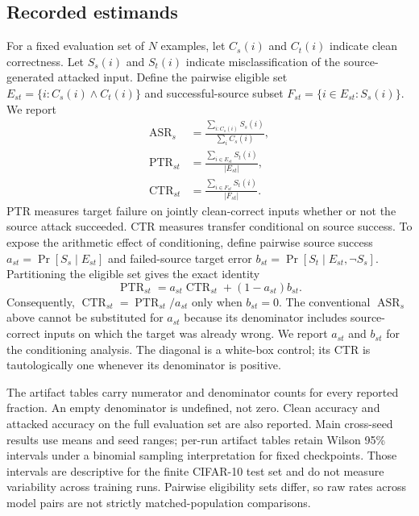 \documentclass[10pt]{article}
\begin{document}
\subsection{Recorded estimands}
For a fixed evaluation set of $N$ examples, let $C_s(i)$ and $C_t(i)$ indicate clean correctness. Let $S_s(i)$ and $S_t(i)$ indicate misclassification of the source-generated attacked input. Define the pairwise eligible set $E_{st}=\{i:C_s(i)\land C_t(i)\}$ and successful-source subset $F_{st}=\{i\in E_{st}:S_s(i)\}$. We report
\begin{align}
\operatorname{ASR}_s &= \frac{\sum_{i:C_s(i)} S_s(i)}{\sum_i C_s(i)},\\
\operatorname{PTR}_{st} &= \frac{\sum_{i\in E_{st}} S_t(i)}{|E_{st}|},\\
\operatorname{CTR}_{st} &= \frac{\sum_{i\in F_{st}} S_t(i)}{|F_{st}|}.
\end{align}
PTR measures target failure on jointly clean-correct inputs whether or not the source attack succeeded. CTR measures transfer conditional on source success. To expose the arithmetic effect of conditioning, define pairwise source success $a_{st}=\Pr[S_s\mid E_{st}]$ and failed-source target error $b_{st}=\Pr[S_t\mid E_{st},\neg S_s]$. Partitioning the eligible set gives the exact identity
\begin{equation}
\operatorname{PTR}_{st}=a_{st}\operatorname{CTR}_{st}+(1-a_{st})b_{st}.
\end{equation}
Consequently, $\operatorname{CTR}_{st}=\operatorname{PTR}_{st}/a_{st}$ only when $b_{st}=0$. The conventional $\operatorname{ASR}_s$ above cannot be substituted for $a_{st}$ because its denominator includes source-correct inputs on which the target was already wrong. We report $a_{st}$ and $b_{st}$ for the conditioning analysis. The diagonal is a white-box control; its CTR is tautologically one whenever its denominator is positive.

The artifact tables carry numerator and denominator counts for every reported fraction. An empty denominator is undefined, not zero. Clean accuracy and attacked accuracy on the full evaluation set are also reported. Main cross-seed results use means and seed ranges; per-run artifact tables retain Wilson 95\% intervals under a binomial sampling interpretation for fixed checkpoints. Those intervals are descriptive for the finite CIFAR-10 test set and do not measure variability across training runs. Pairwise eligibility sets differ, so raw rates across model pairs are not strictly matched-population comparisons.
\end{document}
